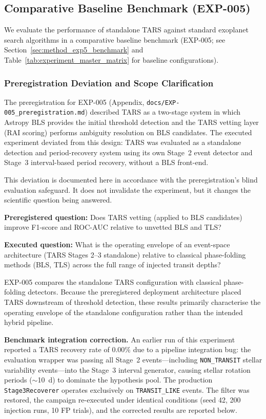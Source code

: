 \subsection{Comparative Baseline Benchmark (EXP-005)} \label{sec:results_exp5_benchmark}
We evaluate the performance of standalone TARS against standard exoplanet search algorithms in a comparative baseline benchmark (EXP-005; see Section~\ref{sec:method_exp5_benchmark} and Table~\ref{tab:experiment_master_matrix} for baseline configurations).

\subsubsection{Preregistration Deviation and Scope Clarification}
\label{sec:exp5_deviation}

The preregistration for EXP-005 (Appendix, \texttt{docs/EXP-005\_preregistration.md}) described TARS as a two-stage system in which Astropy BLS provides the initial threshold detection and the TARS vetting layer (RAI scoring) performs ambiguity resolution on BLS candidates. The executed experiment deviated from this design: TARS was evaluated as a standalone detection and period-recovery system using its own Stage~2 event detector and Stage~3 interval-based period recovery, without a BLS front-end.

This deviation is documented here in accordance with the preregistration's blind evaluation safeguard. It does not invalidate the experiment, but it changes the scientific question being answered.

\textbf{Preregistered question:} Does TARS vetting (applied to BLS candidates) improve F1-score and ROC-AUC relative to unvetted BLS and TLS?

\textbf{Executed question:} What is the operating envelope of an event-space architecture (TARS Stages 2--3 standalone) relative to classical phase-folding methods (BLS, TLS) across the full range of injected transit depths?

EXP-005 compares the standalone TARS configuration with classical phase-folding detectors. Because the preregistered deployment architecture placed TARS downstream of threshold detection, these results primarily characterise the operating envelope of the standalone configuration rather than the intended hybrid pipeline.

\textbf{Benchmark integration correction.} An earlier run of this experiment reported a TARS recovery rate of $0.00\%$ due to a pipeline integration bug: the evaluation wrapper was passing all Stage~2 events---including \texttt{NON\_TRANSIT} stellar variability events---into the Stage~3 interval generator, causing stellar rotation periods ($\sim$10~d) to dominate the hypothesis pool. The production \texttt{Stage3Recoverer} operates exclusively on \texttt{TRANSIT\_LIKE} events. The filter was restored, the campaign re-executed under identical conditions (seed 42, 200 injection runs, 10 FP trials), and the corrected results are reported below.

